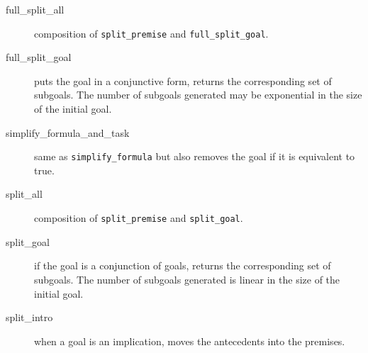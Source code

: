 \begin{description}

\item[full\_split\_all]
  composition of \texttt{split\_premise} and \texttt{full\_split\_goal}.

\item[full\_split\_goal] puts the goal in a conjunctive form,
  returns the corresponding set of subgoals. The number of subgoals
  generated may be exponential in the size of the initial goal.

\item[simplify\_formula\_and\_task] same as \texttt{simplify\_formula}
  but also removes the goal if it is equivalent to true.

\item[split\_all]
  composition of \texttt{split\_premise} and \texttt{split\_goal}.

\item[split\_goal] if the goal is a conjunction of goals, returns the
  corresponding set of subgoals. The number of subgoals generated is linear in
  the size of the initial goal.

\item[split\_intro]
  when a goal is an implication, moves the antecedents into the premises.

\end{description}



